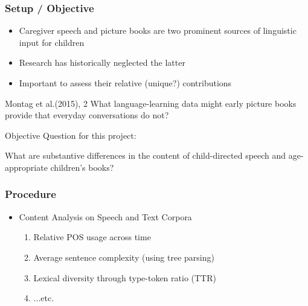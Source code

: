 \documentclass{beamer}
\begin{document}
\begin{frame}
	\frametitle{Setup / Objective}
	\begin{itemize}
		
		\item Caregiver speech and picture books are two prominent sources of linguistic input for children
		\item Research has historically neglected the latter
		\item Important to assess their relative (unique?) contributions
		
	\end{itemize}
	\begin{block}{Montag et al.(2015), 2}
		What language-learning data might early picture books provide that everyday conversations do not?
	\end{block}
\end{frame}


\begin{frame}{Objective}
	\small Question for this project: \\
	\begin{center}
		\Large What are substantive differences in the content of child-directed speech and age-appropriate children's books?
	\end{center}
\end{frame}

\begin{frame}
	\frametitle{Procedure}
	\begin{itemize}
		\item Content Analysis on Speech and Text Corpora
		\begin{enumerate}
			\item Relative POS usage across time
			\item Average sentence complexity (using tree parsing)
			\item Lexical diversity through type-token ratio (TTR)
			\item ...etc.
			
		\end{enumerate}
	\end{itemize}
\end{frame}
\end{document}
